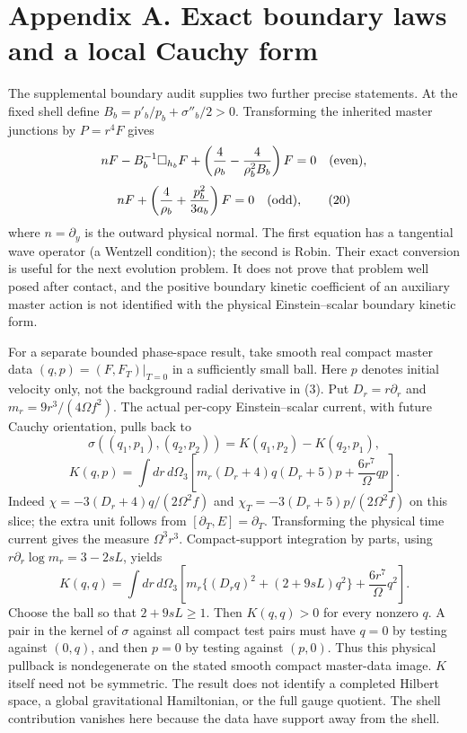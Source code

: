 \documentclass[
  10pt,
]{article}
\begin{document}
\section{Appendix A. Exact boundary laws and a local Cauchy
form}\label{appendix-a.-exact-boundary-laws-and-a-local-cauchy-form}

The supplemental boundary audit supplies two further precise statements.
At the fixed shell define \(B_b=p'_b/p_b+\sigma''_b/2>0\). Transforming
the inherited master junctions by \(P=r^4F\) gives \[
 nF-B_b^{-1}\Box_{h_b}F+
 \left(\frac4{\rho_b}-\frac4{\rho_b^2B_b}\right)F=0
 \quad\hbox{(even)},
\] \[
 nF+\left(\frac4{\rho_b}+\frac{p_b^2}{3a_b}\right)F=0
 \quad\hbox{(odd)},                                      \tag{20}
\] where \(n=\partial_y\) is the outward physical normal. The first
equation has a tangential wave operator (a Wentzell condition); the
second is Robin. Their exact conversion is useful for the next evolution
problem. It does not prove that problem well posed after contact, and
the positive boundary kinetic coefficient of an auxiliary master action
is not identified with the physical Einstein--scalar boundary kinetic
form.

For a separate bounded phase-space result, take smooth real compact
master data \((q,p)=(F,F_T)|_{T=0}\) in a sufficiently small ball. Here
\(p\) denotes initial velocity only, not the background radial
derivative in (3). Put \(D_r=r\partial_r\) and
\(m_r=9r^3/(4\Omega f^2)\). The actual per-copy Einstein--scalar
current, with future Cauchy orientation, pulls back to \[
 \sigma((q_1,p_1),(q_2,p_2))=K(q_1,p_2)-K(q_2,p_1),
\] \[
 K(q,p)=\int dr\,d\Omega_3
 \left[m_r(D_r+4)q(D_r+5)p+\frac{6r^7}{\Omega}qp\right].       \tag{21}
\] Indeed \(\chi=-3(D_r+4)q/(2\Omega^2f)\) and
\(\chi_T=-3(D_r+5)p/(2\Omega^2f)\) on this slice; the extra unit follows
from \([\partial_T,E]=\partial_T\). Transforming the physical time
current gives the measure \(\Omega^3r^3\). Compact-support integration
by parts, using \(r\partial_r\log m_r=3-2sL\), yields \[
 K(q,q)=\int dr\,d\Omega_3
 \left[m_r\{(D_rq)^2+(2+9sL)q^2\}
       +\frac{6r^7}{\Omega}q^2\right].                       \tag{22}
\] Choose the ball so that \(2+9sL\ge1\). Then \(K(q,q)>0\) for every
nonzero \(q\). A pair in the kernel of \(\sigma\) against all compact
test pairs must have \(q=0\) by testing against \((0,q)\), and then
\(p=0\) by testing against \((p,0)\). Thus this physical pullback is
nondegenerate on the stated smooth compact master-data image. \(K\)
itself need not be symmetric. The result does not identify a completed
Hilbert space, a global gravitational Hamiltonian, or the full gauge
quotient. The shell contribution vanishes here because the data have
support away from the shell.
\end{document}
